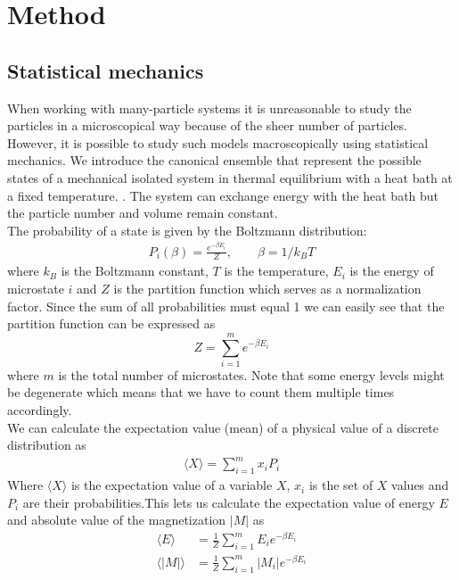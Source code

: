 \documentclass[%
 reprint,
nofootinbib,
aps,
]{revtex4-1}
\begin{document}
\section{Method}
\subsection{Statistical mechanics}
When working with many-particle systems it is unreasonable to study the particles in a microscopical way because of the sheer number of particles. However, it is possible to study such models macroscopically using statistical mechanics. We introduce the canonical ensemble that represent the possible states of a mechanical isolated system in thermal equilibrium with a heat bath at a fixed temperature. \cite{wiki:Canonical_ensemble}. The system can exchange energy with the heat bath but the particle number and volume remain constant. 
 \\
The probability of a state is given by the Boltzmann distribution:
\begin{align*}
    P_i(\beta) = \frac{e^{-\beta E_i}}{Z}, \qquad \beta = 1/k_BT
\end{align*}
where $k_B$ is the Boltzmann constant, $T$ is the temperature, $E_i$ is the energy of microstate $i$ and $Z$ is the partition function which serves as a normalization factor. Since the sum of all probabilities must equal 1 we can easily see that the partition function can be expressed as
\begin{equation}
    Z = \sum_{i = 1}^m e^{-\beta E_i}
    \label{eq:partition}
\end{equation}
where $m$ is the total number of microstates. Note that some energy levels might be degenerate which means that we have to count them multiple times accordingly. \\
We can calculate the expectation value (mean) of a physical value of a discrete distribution as
\begin{align*}
    \langle X \rangle = \sum_{i = 1}^{m} x_i P_i
\end{align*}
Where $\langle X \rangle$ is the expectation value of a variable $X$, $x_i$ is the set of $X$ values and $P_i$ are their probabilities.\newpage This lets us calculate the expectation value of energy $E$ and absolute value of the magnetization $|M|$ as
\begin{align}
    \langle E \rangle &= \frac{1}{Z} \sum_{i = 1}^{m} E_i e^{-\beta E_i} \label{eq:E_num}\\
    \langle |M| \rangle &= \frac{1}{Z} \sum_{i = 1}^{m} |M_i| e^{-\beta E_i} \label{eq:|M|_num}
\end{align}
\end{document}

